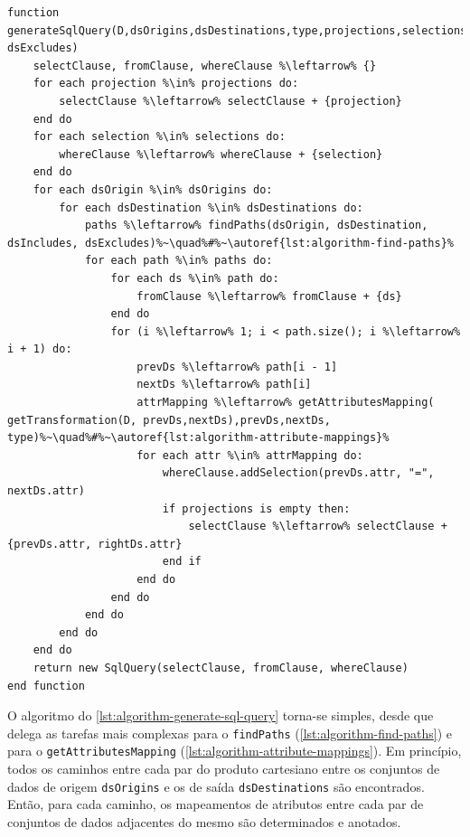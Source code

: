 \begin{minipage}[c]{0.95\textwidth}
\begin{lstlisting}[language=pseudocode,label={lst:algorithm-generate-sql-query},caption={[Geração da consulta em SQL]Geração da consulta na linguagem SQL a partir das especificações do usuário.}]
function generateSqlQuery(D,dsOrigins,dsDestinations,type,projections,selections,dsIncludes, dsExcludes)
    selectClause, fromClause, whereClause %\leftarrow% {}
    for each projection %\in% projections do:
        selectClause %\leftarrow% selectClause + {projection}
    end do
    for each selection %\in% selections do:
        whereClause %\leftarrow% whereClause + {selection}
    end do
    for each dsOrigin %\in% dsOrigins do:
        for each dsDestination %\in% dsDestinations do:
            paths %\leftarrow% findPaths(dsOrigin, dsDestination, dsIncludes, dsExcludes)%~\quad%#%~\autoref{lst:algorithm-find-paths}%
            for each path %\in% paths do:
                for each ds %\in% path do:
                    fromClause %\leftarrow% fromClause + {ds}
                end do                
                for (i %\leftarrow% 1; i < path.size(); i %\leftarrow% i + 1) do:
                    prevDs %\leftarrow% path[i - 1]
                    nextDs %\leftarrow% path[i]
                    attrMapping %\leftarrow% getAttributesMapping( getTransformation(D, prevDs,nextDs),prevDs,nextDs, type)%~\quad%#%~\autoref{lst:algorithm-attribute-mappings}%
                    for each attr %\in% attrMapping do:
                        whereClause.addSelection(prevDs.attr, "=", nextDs.attr)
                        if projections is empty then:
                            selectClause %\leftarrow% selectClause + {prevDs.attr, rightDs.attr}
                        end if
                    end do
                end do
            end do
        end do
    end do
    return new SqlQuery(selectClause, fromClause, whereClause)
end function
\end{lstlisting}
\end{minipage}

O algoritmo do \autoref{lst:algorithm-generate-sql-query} torna-se simples, desde que delega as tarefas mais complexas para o \texttt{findPaths} (\autoref{lst:algorithm-find-paths}) e para o \texttt{getAttributesMapping} (\autoref{lst:algorithm-attribute-mappings}). Em princípio, todos os caminhos entre cada par do produto cartesiano entre os conjuntos de dados de origem \texttt{dsOrigins} e os de saída \texttt{dsDestinations} são encontrados. Então, para cada caminho, os mapeamentos de atributos entre cada par de conjuntos de dados adjacentes do mesmo são determinados e anotados.

